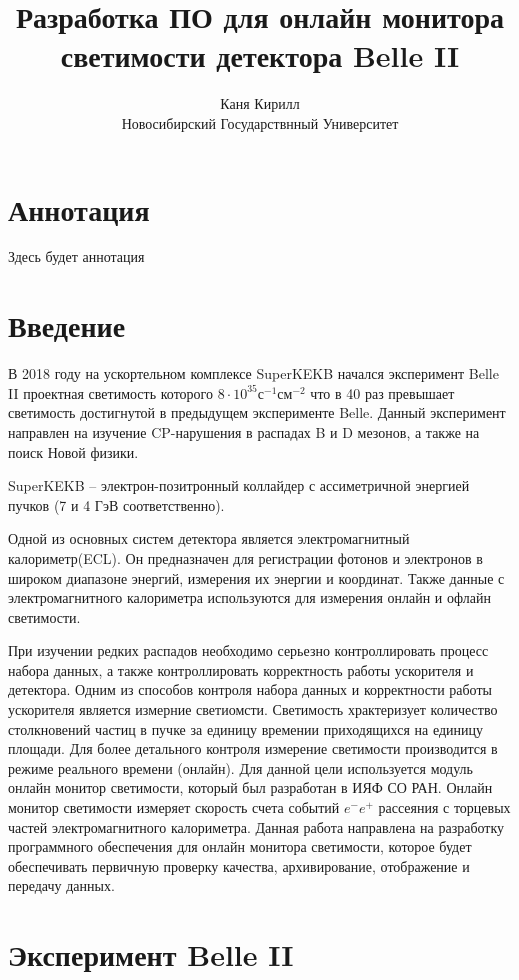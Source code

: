 \documentclass[a4paper, 12pt]{article}
\title{Разработка ПО для онлайн монитора светимости детектора Belle II}
\author{Каня Кирилл\\Новосибирский Государствнный Университет}
\begin{document}
\maketitle
\newpage

\section*{Аннотация}
Здесь будет аннотация
\newpage

\tableofcontents
\newpage

\section{Введение}
  В 2018 году на ускортельном комплексе SuperKEKB начался эксперимент Belle II проектная светимость которого $8\cdot10^{35}$с$^{-1}$см$^{-2}$ что в 40 раз превышает светимость достигнутой в предыдущем эксперименте Belle. Данный эксперимент направлен на изучение CP-нарушения в распадах B и D мезонов, а также на поиск Новой физики.\par
  SuperKEKB -- электрон-позитронный коллайдер с ассиметричной энергией пучков (7 и 4 ГэВ соответственно).\par
  Одной из основных систем детектора является электромагнитный калориметр(ECL). Он предназначен для регистрации фотонов и электронов в широком диапазоне энергий, измерения их энергии и координат. Также данные с электромагнитного калориметра используются для измерения онлайн и офлайн светимости.\par
  При изучении редких распадов необходимо серьезно контроллировать процесс набора данных, а также контроллировать корректность работы ускорителя и детектора. Одним из способов контроля набора данных и корректности работы ускорителя является измерние светиомсти. Светимость храктеризует количество столкновений частиц в пучке за единицу времении приходящихся на единицу площади. Для более детального контроля измерение светимости производится в режиме реального времени (онлайн). Для данной цели используется модуль онлайн монитор светимости, который был разработан в ИЯФ СО РАН. Онлайн монитор светимости измеряет скорость счета событий $e^-e^+$ рассеяния с торцевых частей электромагнитного калориметра. Данная работа направлена на разработку программного обеспечения для онлайн монитора светимости, которое будет обеспечивать первичную проверку качества, архивирование, отображение и передачу данных.\par

\section{Эксперимент Belle II}
\end{document}
